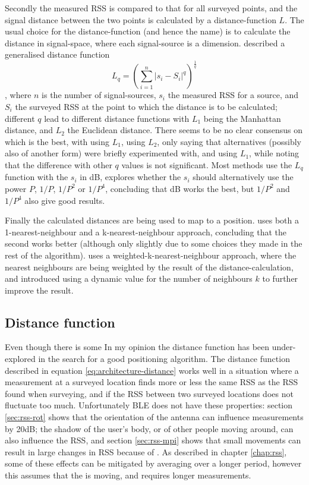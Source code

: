 Secondly the measured RSS is compared to that for all surveyed points, and the signal distance between the two points is calculated by a distance-function $L$.
The usual choice for the distance-function (and hence the name) is to calculate the distance in signal-space, where each signal-source is a dimension.
\citet{li2005method} described a generalised distance function
\begin{equation}
    L_q = \left(\sum_{i=1}^{n}|s_i-S_i|^q\right)^{\frac{1}{q}}
    \label{eq:architecture-distance}
\end{equation}
, where $n$ is the number of signal-sources, $s_i$ the measured RSS for a source, and $S_i$ the surveyed RSS at the point to which the distance is to be calculated; different $q$ lead to different distance functions with $L_1$ being the Manhattan distance, and $L_2$ the Euclidean distance.
There seems to be no clear consensus on which is the best, with \citet{shin2012enhanced} using $L_1$, \citet{bahl2000radar} using $L_2$, only saying that alternatives (possibly also of another form) were briefly experimented with, and \citet{li2005method} using $L_1$, while noting that the difference with other $q$ values is not significant.
Most methods use the $L_q$ function with the $s_i$ in dB, \citet{li2005method} explores whether the $s_i$ should alternatively use the power $P$, $1/P$, $1/P^2$ or $1/P^4$, concluding that dB works the best, but $1/P^2$ and $1/P^4$ also give good results.

Finally the calculated distances are being used to map to a position.
\citet{bahl2000radar} uses both a 1-nearest-neighbour and a k-nearest-neighbour approach, concluding that the second works better (although only slightly due to some choices they made in the rest of the algorithm).
\citet{li2005method} uses a weighted-k-nearest-neighbour approach, where the nearest neighbours are being weighted by the result of the distance-calculation, and \citet{shin2012enhanced} introduced using a dynamic value for the number of neighbours $k$ to further improve the result.

\subsection{Distance function}
Even though there is some 
In my opinion the distance function has been under-explored in the search for a good positioning algorithm.
The distance function described in equation \ref{eq:architecture-distance} works well in a situation where a measurement at a surveyed location finds more or less the same RSS as the RSS found when surveying, and if the RSS between two surveyed locations does not fluctuate too much.
Unfortunately BLE does not have these properties: section \ref{sec:rss-rot} shows that the orientation of the antenna can influence measurements by 20dB; the shadow of the user's body, or of other people moving around, can also influence the RSS, and section \ref{sec:rss-mpi} shows that small movements can result in large changes in RSS because of \mpi.
As described in chapter \ref{chap:rss}, some of these effects can be mitigated by averaging over a longer period, however this assumes that the \device is moving, and requires longer measurements.


